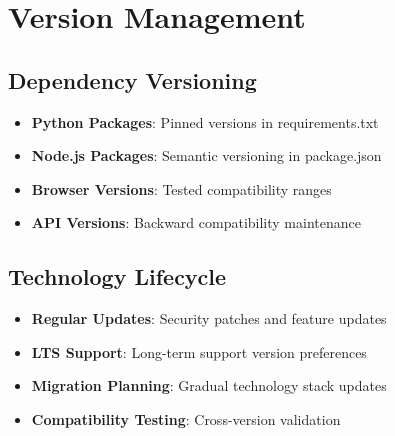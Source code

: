 \section{Version Management}
\label{sec:version-management}

\subsection{Dependency Versioning}
\label{subsec:dependency-versioning}

\begin{itemize}
    \item \textbf{Python Packages}: Pinned versions in requirements.txt
    \item \textbf{Node.js Packages}: Semantic versioning in package.json
    \item \textbf{Browser Versions}: Tested compatibility ranges
    \item \textbf{API Versions}: Backward compatibility maintenance
\end{itemize}

\subsection{Technology Lifecycle}
\label{subsec:technology-lifecycle}

\begin{itemize}
    \item \textbf{Regular Updates}: Security patches and feature updates
    \item \textbf{LTS Support}: Long-term support version preferences
    \item \textbf{Migration Planning}: Gradual technology stack updates
    \item \textbf{Compatibility Testing}: Cross-version validation
\end{itemize} 